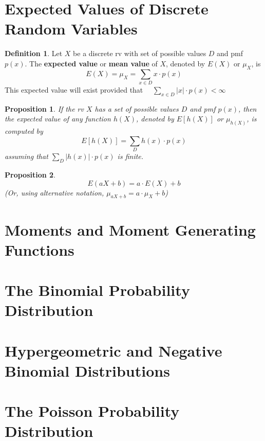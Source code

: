 \documentclass[a4paper]{report}
\theoremstyle{definition}
\newtheorem{definition}{Definition}
\theoremstyle{plain}
\newtheorem{prop}{Proposition}
\begin{document}
\section{Expected Values of Discrete Random Variables}
\begin{definition}
  Let $X$ be a discrete rv with set of possible values $D$ and pmf 
  $p(x)$. The \textbf{expected value} or \textbf{mean value} of $X$,
  denoted by $E(X)$ or $\mu_X$, is
  \begin{equation*}
    E(X) = \mu_X = \sum_{x \in D} x \cdot p(x)
  \end{equation*}
  This expected value will exist provided that $\quad \sum_{x \in D} 
  |x| \cdot p(x) < \infty$
\end{definition}

\begin{prop}
  If the rv $X$ has a set of possible values $D$ and pmf $p(x)$, then
  the expected value of any function $h(X)$, denoted by $E[h(X)]$ or
  $\mu_{h(X)}$, is computed by
  \begin{equation*}
    E[h(X)] = \sum_D h(x) \cdot p(x)
  \end{equation*}
  assuming that $\sum_D |h(x)| \cdot p(x)$ is finite.
\end{prop}

\begin{prop}
  \begin{equation*}
      E(aX + b) = a \cdot E(X) + b
  \end{equation*}
  (Or, using alternative notation,  $\mu_{aX + b} = a \cdot \mu_X + b$)
\end{prop}

\section{Moments and Moment Generating Functions}

\section{The Binomial Probability Distribution}

\section{Hypergeometric and Negative Binomial Distributions}

\section{The Poisson Probability Distribution}
\end{document}

